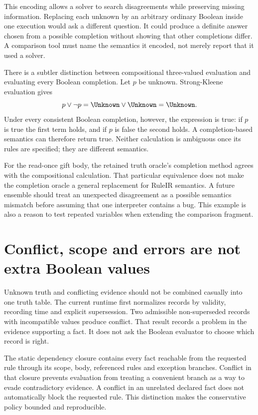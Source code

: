 This encoding allows a solver to search disagreements while preserving missing
information. Replacing each unknown by an arbitrary ordinary Boolean inside
one execution would ask a different question. It could produce a definite answer
chosen from a possible completion without showing that other completions differ.
A comparison tool must name the semantics it encoded, not merely report that it
used a solver.

There is a subtler distinction between compositional three-valued evaluation
and evaluating every Boolean completion. Let $p$ be unknown. Strong-Kleene
evaluation gives
\begin{equation}
 p\lor\neg p=\Unknown\lor\Unknown=\Unknown.
 \label{eq:unknown-tautology}
\end{equation}
Under every consistent Boolean completion, however, the expression is true:
if $p$ is true the first term holds, and if $p$ is false the second holds. A
completion-based semantics can therefore return true. Neither calculation is
ambiguous once its rules are specified; they are different semantics.

For the read-once gift body, the retained truth oracle's completion method agrees
with the compositional calculation. That particular equivalence does not make
the completion oracle a general replacement for RuleIR semantics. A future
ensemble should treat an unexpected disagreement as a possible semantics
mismatch before assuming that one interpreter contains a bug. This example is
also a reason to test repeated variables when extending the comparison fragment.

\section{Conflict, scope and errors are not extra Boolean values}
\label{merge:M03:06}

\label{sec:proof-tags}
Unknown truth and conflicting evidence should not be combined casually into one
truth table. The current runtime first normalizes records by validity,
recording time and explicit supersession. Two admissible non-superseded records
with incompatible values produce conflict. That result records a problem in
the evidence supporting a fact. It does not ask the Boolean evaluator to choose
which record is right.

The static dependency closure contains every fact reachable from the requested
rule through its scope, body, referenced rules and exception branches. Conflict
in that closure prevents evaluation from treating a convenient branch as a way
to evade contradictory evidence. A conflict in an unrelated declared fact does
not automatically block the requested rule. This distinction makes the
conservative policy bounded and reproducible.

